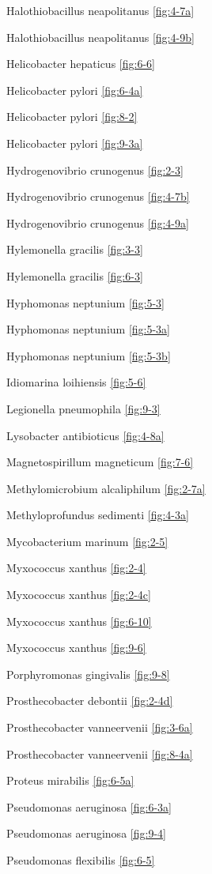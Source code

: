 \documentclass[]{tufte-book}
\begin{document}
Halothiobacillus neapolitanus \ref{fig:4-7a}

Halothiobacillus neapolitanus \ref{fig:4-9b}

Helicobacter hepaticus \ref{fig:6-6}

Helicobacter pylori \ref{fig:6-4a}

Helicobacter pylori \ref{fig:8-2}

Helicobacter pylori \ref{fig:9-3a}

Hydrogenovibrio crunogenus \ref{fig:2-3}

Hydrogenovibrio crunogenus \ref{fig:4-7b}

Hydrogenovibrio crunogenus \ref{fig:4-9a}

Hylemonella gracilis \ref{fig:3-3}

Hylemonella gracilis \ref{fig:6-3}

Hyphomonas neptunium \ref{fig:5-3}

Hyphomonas neptunium \ref{fig:5-3a}

Hyphomonas neptunium \ref{fig:5-3b}

Idiomarina loihiensis \ref{fig:5-6}

Legionella pneumophila \ref{fig:9-3}

Lysobacter antibioticus \ref{fig:4-8a}

Magnetospirillum magneticum \ref{fig:7-6}

Methylomicrobium alcaliphilum \ref{fig:2-7a}

Methyloprofundus sedimenti \ref{fig:4-3a}

Mycobacterium marinum \ref{fig:2-5}

Myxococcus xanthus \ref{fig:2-4}

Myxococcus xanthus \ref{fig:2-4c}

Myxococcus xanthus \ref{fig:6-10}

Myxococcus xanthus \ref{fig:9-6}

Porphyromonas gingivalis \ref{fig:9-8}

Prosthecobacter debontii \ref{fig:2-4d}

Prosthecobacter vanneervenii \ref{fig:3-6a}

Prosthecobacter vanneervenii \ref{fig:8-4a}

Proteus mirabilis \ref{fig:6-5a}

Pseudomonas aeruginosa \ref{fig:6-3a}

Pseudomonas aeruginosa \ref{fig:9-4}

Pseudomonas flexibilis \ref{fig:6-5}
\end{document}
